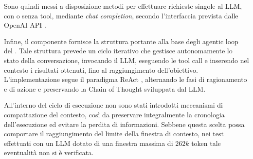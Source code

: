 

Sono quindi messi a disposizione metodi per effettuare richieste singole al LLM, con o senza tool, mediante \emph{chat completion}, secondo l'interfaccia prevista dalle OpenAI API \cite{openai2026apidocs}.




Infine, il componente fornisce la struttura portante alla base degli agentic loop del \sreagent{}. Tale struttura prevede un ciclo iterativo che gestisce autonomamente lo stato della conversazione, invocando il LLM, eseguendo le tool call e inserendo nel contesto i risultati ottenuti, fino al raggiungimento dell'obiettivo. L'implementazione segue il paradigma ReAct \cite{yao2023react}, alternando le fasi di ragionamento e di azione e preservando la Chain of Thought sviluppata dal LLM.


All'interno del ciclo di esecuzione non sono stati introdotti meccanismi di compattazione del contesto, così da preservare integralmente la cronologia dell'esecuzione ed evitare la perdita di informazioni. Sebbene questa scelta possa comportare il raggiungimento del limite della finestra di contesto, nei test effettuati con un LLM dotato di una finestra massima di $262k$ token tale eventualità non si è verificata.

